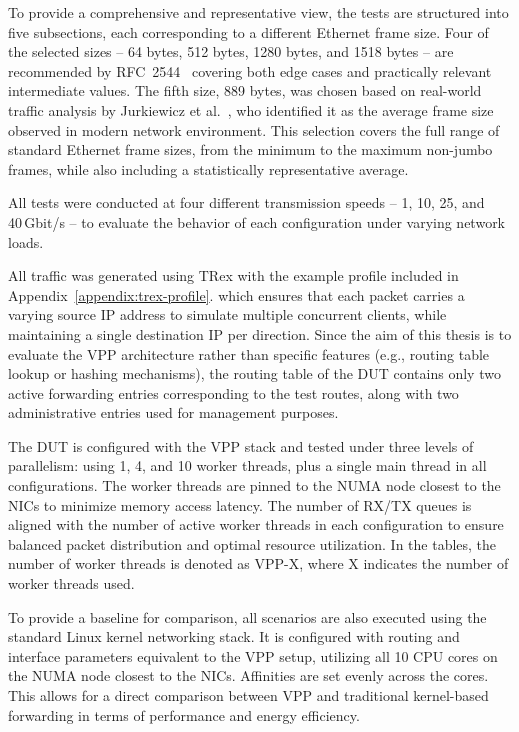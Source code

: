 To provide a comprehensive and representative view, the tests are structured into five subsections, each corresponding to a different Ethernet frame size. 
Four of the selected sizes -- 64 bytes, 512 bytes, 1280 bytes, and 1518 bytes -- are recommended by RFC~2544~\cite{rfc2544} 
covering both edge cases and practically relevant intermediate values. 
The fifth size, 889 bytes, was chosen based on real-world traffic analysis by Jurkiewicz et al.~\cite{JURKIEWICZ202115}, who identified it as the average frame size observed in modern network environment.
This selection covers the full range of standard Ethernet frame sizes, from the minimum to the maximum non-jumbo frames, 
while also including a statistically representative average.

All tests were conducted at four different transmission speeds -- 1, 10, 25, and 40 Gbit/s -- to evaluate the behavior of each configuration under varying network loads.

All traffic was generated using TRex with the example profile included in Appendix~\ref{appendix:trex-profile}.
which ensures that each packet carries a varying source IP address to simulate multiple concurrent clients, while maintaining a single destination IP per direction.
Since the aim of this thesis is to evaluate the VPP architecture rather than specific features (e.g., routing table lookup or hashing mechanisms),
the routing table of the DUT contains only two active forwarding entries corresponding to the test routes,
along with two administrative entries used for management purposes.

The DUT is configured with the VPP stack and tested under three levels of parallelism: using 1, 4, and 10 worker threads, plus a single main thread in all configurations.
The worker threads are pinned to the NUMA node closest to the NICs to minimize memory access latency.
The number of RX/TX queues is aligned with the number of active worker threads in each configuration to ensure balanced packet distribution and optimal resource utilization.
In the tables, the number of worker threads is denoted as VPP-X, where X indicates the number of worker threads used.

To provide a baseline for comparison, all scenarios are also executed using the standard Linux kernel networking stack.
It is configured with routing and interface parameters equivalent to the VPP setup, utilizing all 10 CPU cores on the NUMA node closest to the NICs.
Affinities are set evenly across the cores.
This allows for a direct comparison between VPP and traditional kernel-based forwarding in terms of performance and energy efficiency.

